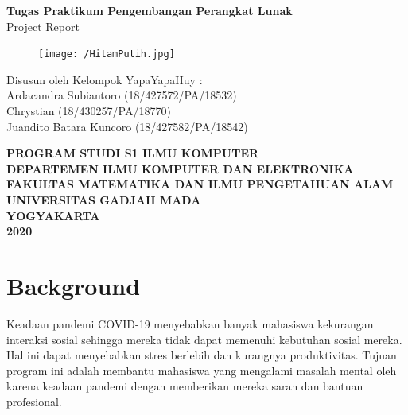 \documentclass{article}
\begin{document}
	\begin{titlepage}
		\begin{center}
			
			\null
			{
				\huge \bfseries Tugas Praktikum Pengembangan Perangkat Lunak}\\
			[1cm]
			{\LARGE Project Report}\\
			
			\vspace{2cm}
			
			\begin{figure}[H]
				\centering
				\texttt{[image: /HitamPutih.jpg]}
			\end{figure}
			
			\vspace{3cm}
			
			{\Large 
				Disusun oleh Kelompok YapaYapaHuy} {\Large :\\
				\vspace{0.5cm}
				Ardacandra Subiantoro (18/427572/PA/18532)\\
				Chrystian (18/430257/PA/18770)\\
				Juandito Batara Kuncoro (18/427582/PA/18542)\\
			}
			
			
			\vspace{2cm}
			
			{\normalsize \bfseries
				PROGRAM STUDI S1 ILMU KOMPUTER\\
				DEPARTEMEN ILMU KOMPUTER DAN ELEKTRONIKA\\
				FAKULTAS MATEMATIKA DAN ILMU PENGETAHUAN ALAM\\
				UNIVERSITAS GADJAH MADA\\
				YOGYAKARTA\\
				\vspace{0.2cm}
				2020
			}
			
		\end{center}
	\end{titlepage}

	\newpage
	
	\section{Background}
	\par Keadaan pandemi COVID-19 menyebabkan banyak mahasiswa kekurangan interaksi sosial sehingga mereka tidak dapat memenuhi kebutuhan sosial mereka. Hal ini dapat menyebabkan stres berlebih dan kurangnya produktivitas. Tujuan program ini adalah membantu mahasiswa yang mengalami masalah mental oleh karena keadaan pandemi dengan memberikan mereka saran dan bantuan profesional. 
\end{document}
